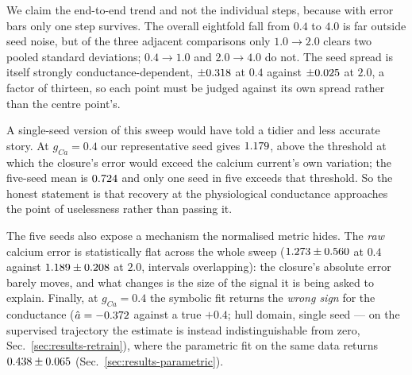 \documentclass{article}
\newcommand{\gcaMain}{2.0}     %
\newcommand{\gcaPhys}{0.4}     %
\newcommand{\gcaMid}{1.0}      %
\newcommand{\gcaHi}{4.0}       %
\begin{document}
We claim the end-to-end trend and not the individual steps, because with error
bars only one step survives. The overall eightfold fall from $\gcaPhys$ to
$\gcaHi$ is far outside seed noise, but of the three adjacent comparisons only
$\gcaMid \to \gcaMain$ clears two pooled standard deviations; $\gcaPhys \to
\gcaMid$ and $\gcaMain \to \gcaHi$ do not. %
The seed spread is itself strongly conductance-dependent,
$\pm0.318$ at $\gcaPhys$ against
$\pm0.025$ at $\gcaMain$, a factor of thirteen, so each point
must be judged against its own spread rather than the centre point's.

A single-seed version of this sweep would have told a tidier and less accurate
story. At $g_{Ca}=\gcaPhys$ our representative seed gives
$1.179$, above the
threshold at which the closure's error would exceed the calcium current's own
variation; the five-seed mean is $0.724$ and only one
seed in five exceeds that threshold. %
So the honest statement is that recovery at the physiological conductance
approaches the point of uselessness rather than passing it.

The five seeds also expose a mechanism the normalised metric hides. The
\emph{raw} calcium error is statistically flat across the whole sweep
($1.273 \pm 0.560$ at $\gcaPhys$ against
$1.189 \pm 0.208$ at $\gcaMain$, intervals overlapping): the
closure's absolute error barely moves, and what changes is the size of the signal
it is being asked to explain. Finally, at $g_{Ca}=\gcaPhys$ the symbolic fit
returns the \emph{wrong sign} for the conductance
($\hat a = -0.372$ against a true $+\gcaPhys$; hull domain,
single seed --- on the supervised trajectory the estimate is instead
indistinguishable from zero, Sec.~\ref{sec:results-retrain}), where the
parametric fit on the same data returns
$0.438 \pm 0.065$ (Sec.~\ref{sec:results-parametric}).
\end{document}
